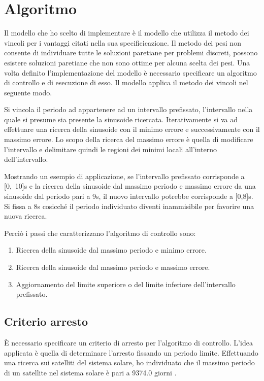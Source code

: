 \documentclass[a4paper,12pt]{report}
\begin{document}
\section{Algoritmo}
\label{ss:controllo}
Il modello che ho scelto di implementare è il modello che utilizza il metodo dei vincoli per i vantaggi citati nella sua specificicazione.
Il metodo dei pesi non consente di individuare tutte le soluzioni paretiane per problemi discreti, possono esistere soluzioni paretiane che non sono ottime per alcuna scelta dei pesi.
Una volta definito l'implementazione del modello è necessario specificare un algoritmo di controllo e di esecuzione di esso.
Il modello applica il metodo dei vincoli nel seguente modo.

Si vincola il periodo ad appartenere ad un intervallo prefissato, l'intervallo nella quale si presume sia presente la sinusoide ricercata. Iterativamente si va ad effettuare una ricerca della sinusoide con il minimo errore e successivamente con il massimo errore. Lo scopo della ricerca del massimo errore è quella di modificare l'intervallo e delimitare quindi le regioni dei minimi locali all'interno dell'intervallo.

Mostrando un esempio di applicazione, se l'intervallo prefissato corrisponde a [0,~10]s e la ricerca della sinusoide dal massimo periodo e massimo errore da una sinusoide dal periodo pari a 9s, il nuovo intervallo potrebbe corrisponde a [0,8]s. Si fissa a 8s cosicché il periodo individuato diventi inammisibile per favorire una nuova ricerca.

Perciò i passi che caratterizzano l'algoritmo di controllo sono:
\begin{enumerate}
  \item Ricerca della sinusoide dal massimo periodo e minimo errore.
  \item Ricerca della sinusoide dal massimo periodo e massimo errore.
  \item Aggiornamento del limite superiore o del limite inferiore dell'intervallo prefissato.
\end{enumerate}


\subsection{Criterio arresto}
\label{ss:arresto}
È necessario specificare un criterio di arresto per l'algoritmo di controllo. L'idea applicata è quella di determinare l'arresto fissando un periodo limite. Effettuando una ricerca sui satelliti del sistema solare, ho individuato che il massimo periodo di un satellite nel sistema solare è pari a 9374.0 giorni \cite{nasa}.
\end{document}
